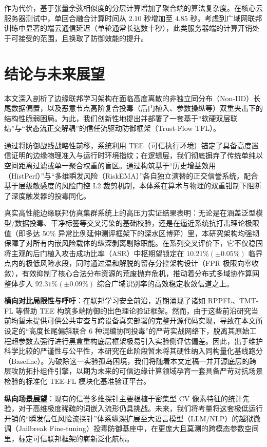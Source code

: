 \documentclass[runningheads]{llncs}
\begin{document}
作为代价，基于张量余弦相似度的分层计算增加了聚合端的算法复杂度。在核心云服务器测试中，单回合融合计算时间从 $2.10$ 秒增加至 $4.85$ 秒。考虑到广域网联邦训练中显著的端云通信延迟（单轮通常长达数十秒），此类服务器端的计算开销处于可接受的范围，且换取了防御效能的提升。

\section{结论与未来展望}
本文深入剖析了边缘联邦学习架构在面临高度离散的非独立同分布（Non-IID）长尾数据偏置，以及恶意节点高阶复合投毒（后门植入、参数操纵等）双重夹击下的结构性脆弱困局。为此，我们创新性地提出并部署了一套基于“软硬双层联结”与“状态流正交解耦”的信任流驱动防御框架（Trust-Flow TFL）。

通过将防御战线战略性前移，系统利用 TEE（可信执行环境）锚定了具备高度置信证明的边缘物理准入与运行时环境指纹；在逻辑层，我们彻底摒弃了传统单纯以空间距离过滤或单一聚合权重的盲区。通过构筑基于“历史增益效用（HistPerf）”与“多维瞬发风险（RiskEMA）”各自独立演替的正交信誉系统，配合基于层级敏感度的风险门控 L2 裁剪机制，本体系在算术与物理的双重钳制下阻断了深度触发器的投毒同化。

真实高性能边缘联邦仿真集群系统上的高压力实证结果表明：无论是在涵盖泛型模型/数据投毒、干净标签等交叉污染的基础校验，还是在逼近系统抗打击理论极限值（即多达 50\% 异常比例延伸测评框架下的深水区博弈）里，本研究架构均强韧保障了对所有内嵌风险载体的纵深剥离剔除职能。在系列交叉评价下，它不仅稳固将主观的后门植入攻击成功比率（ASR）中枢期望锁定在 $10.21\% (\pm 0.05\%)$ 临界点内的极低风险水段，同时通过温和解脱的留存分控架构设计（FPR 极限向零收敛），有效抑制了核心合法分布资源的荒废抛弃危机，推动着分布式多域协作算网整体步入 $92.31\% (\pm 0.09\%)$ 综合广域识别率的高效稳定收敛信道之上。

\textbf{横向对比局限性与呼吁}：在联邦学习安全前沿，近期涌现了诸如 RPPFL\cite{zhang2025rppfl}、TMT-FL\cite{lu2025tmt} 等借助 TEE 构筑多端防御的出色理论验证框架。然而，由于这些前沿研究当前均暂未提供可供公共审查与跨设备真实部署的完整开源代码实现，导致在本文所设定的“高度长尾偏斜联合 6 种混编协同投毒”的严苛实战网络下，脱离其原始工程超参数去强行进行黑盒重构底层框架极易引入实验侧评估偏差。因此，出于维护科学比较的严谨性与公平性，本研究在此阶段暂未将其硬性纳入同构量化基线跑分（Baseline）。为破除这一实验孤岛困境，我们将随着本文定稿一并开源底层的跨层攻防拓扑组件引擎，以期为未来的可信边缘计算领域孕育一套具备严苛对抗场景检验的标准化 TEE-FL 模块化基准验证平台。

\textbf{纵向场景展望}：现有的信誉多维探针主要根植于密集型 CV 像素特征的统计先验，对于高维极度稀疏的词嵌入流形仍具挑战。未来，我们将考量将这套极低运行开销的“瞬发信任风险流探针”体系纵深扩展至大语言模型（LLM/NLP）的越狱微调（Jailbreak Fine-tuning）投毒防御基座中，在更庞大且莫测的跨模态参数空间里，标定可信联邦框架的崭新泛化航标。
\end{document}
